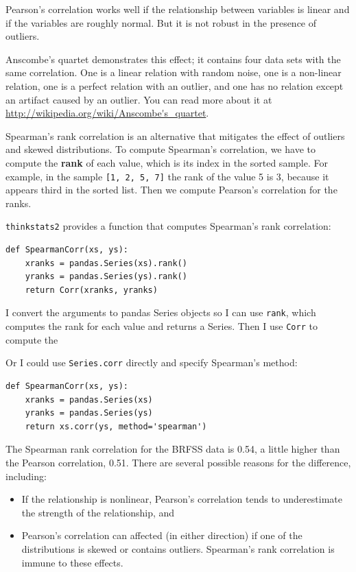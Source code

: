 \documentclass[12pt]{book}
\begin{document}
Pearson's correlation works well if the relationship between variables
is linear and if the variables are roughly normal.  But it is not
robust in the presence of outliers.

Anscombe's quartet demonstrates this effect; it contains four data
sets with the same correlation.  One is a linear relation with random
noise, one is a non-linear relation, one is a perfect relation with an
outlier, and one has no relation except an artifact caused by an
outlier.  You can read more about it at
\url{http://wikipedia.org/wiki/Anscombe's_quartet}.

Spearman's rank correlation is an alternative that mitigates the
effect of outliers and skewed distributions.  To compute Spearman's
correlation, we have to compute the {\bf rank} of each value, which is its
index in the sorted sample.  For example, in the sample {\tt [1, 2, 5, 7]}
the rank of the value 5 is 3, because it appears third in the sorted
list.  Then we compute Pearson's correlation for the ranks.

{\tt thinkstats2} provides a function that computes Spearman's rank
correlation:

\begin{verbatim}
def SpearmanCorr(xs, ys):
    xranks = pandas.Series(xs).rank()
    yranks = pandas.Series(ys).rank()
    return Corr(xranks, yranks)
\end{verbatim}

I convert the arguments to pandas Series objects so I can use
{\tt rank}, which computes the rank for each value and returns
a Series.  Then I use {\tt Corr} to compute the 

Or I could use {\tt Series.corr} directly and specify
Spearman's method:

\begin{verbatim}
def SpearmanCorr(xs, ys):
    xranks = pandas.Series(xs)
    yranks = pandas.Series(ys)
    return xs.corr(ys, method='spearman')
\end{verbatim}

The Spearman rank correlation for the BRFSS data is 0.54, a little
higher than the Pearson correlation, 0.51.  There are several possible
reasons for the difference, including:

\begin{itemize}

\item If the relationship is
nonlinear, Pearson's correlation tends to underestimate the strength
of the relationship, and 

\item Pearson's correlation can affected (in either direction)
if one of the distributions is skewed or contains outliers.  Spearman's
rank correlation is immune to these effects.

\end{itemize}
\end{document}
